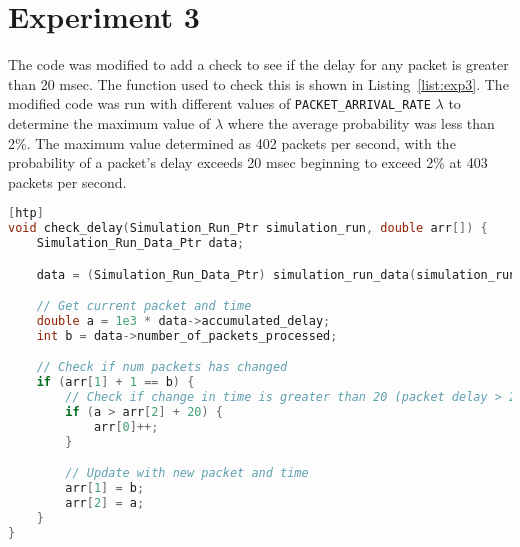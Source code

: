 \section*{Experiment 3}

The code was modified to add a check to see if the delay for any packet is greater than 20 msec. The function used to check this is shown in Listing~\ref{list:exp3}. The modified code was run with different values of \texttt{PACKET\_ARRIVAL\_RATE} $\lambda$ to determine the maximum value of $\lambda$ where the average probability was less than 2\%. The maximum value determined as 402 packets per second, with the probability of a packet's delay exceeds 20 msec beginning to exceed 2\% at 403 packets per second.

\begin{lstlisting}[language=C, caption={Modifications to Experiment 3 Code}, label={list:exp3}][htp]
void check_delay(Simulation_Run_Ptr simulation_run, double arr[]) {
    Simulation_Run_Data_Ptr data;

    data = (Simulation_Run_Data_Ptr) simulation_run_data(simulation_run);

    // Get current packet and time
    double a = 1e3 * data->accumulated_delay;
    int b = data->number_of_packets_processed;

    // Check if num packets has changed
    if (arr[1] + 1 == b) {
        // Check if change in time is greater than 20 (packet delay > 20 msec)
        if (a > arr[2] + 20) {
            arr[0]++;
        }

        // Update with new packet and time
        arr[1] = b;
        arr[2] = a;
    }
}
\end{lstlisting}